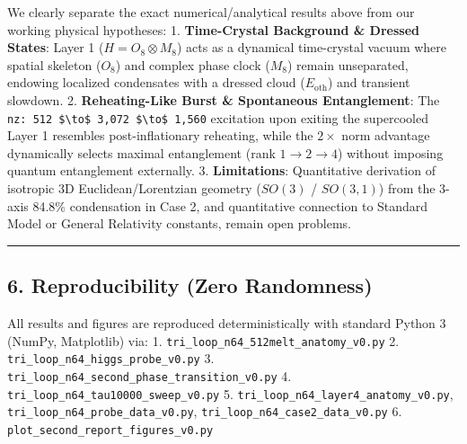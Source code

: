 \documentclass[
  a4paper,
]{article}
\begin{document}
We clearly separate the exact numerical/analytical results above from
our working physical hypotheses: 1. \textbf{Time-Crystal Background \&
Dressed States}: Layer 1 (\(H = O_8 \otimes M_8\)) acts as a dynamical
time-crystal vacuum where spatial skeleton (\(O_8\)) and complex phase
clock (\(M_8\)) remain unseparated, endowing localized condensates with
a dressed cloud (\(E_{\mathrm{oth}}\)) and transient slowdown. 2.
\textbf{Reheating-Like Burst \& Spontaneous Entanglement}: The
\texttt{nz:\ 512\ \$\textbackslash{}to\$\ 3,072\ \$\textbackslash{}to\$\ 1,560}
excitation upon exiting the supercooled Layer 1 resembles
post-inflationary reheating, while the \(2\times\) norm advantage
dynamically selects maximal entanglement (rank \(1 \to 2 \to 4\))
without imposing quantum entanglement externally. 3.
\textbf{Limitations}: Quantitative derivation of isotropic 3D
Euclidean/Lorentzian geometry (\(SO(3)\) / \(SO(3,1)\)) from the 3-axis
84.8\% condensation in Case 2, and quantitative connection to Standard
Model or General Relativity constants, remain open problems.

\begin{center}\rule{0.5\linewidth}{0.5pt}\end{center}

\subsection{6. Reproducibility (Zero
Randomness)}\label{reproducibility-zero-randomness}

All results and figures are reproduced deterministically with standard
Python 3 (NumPy, Matplotlib) via: 1.
\texttt{tri\_\allowbreak{}loop\_\allowbreak{}n64\_\allowbreak{}512melt\_\allowbreak{}anatomy\_\allowbreak{}v0.py} 2.
\texttt{tri\_\allowbreak{}loop\_\allowbreak{}n64\_\allowbreak{}higgs\_\allowbreak{}probe\_\allowbreak{}v0.py} 3.
\texttt{tri\_\allowbreak{}loop\_\allowbreak{}n64\_\allowbreak{}second\_\allowbreak{}phase\_\allowbreak{}transition\_\allowbreak{}v0.py} 4.
\texttt{tri\_\allowbreak{}loop\_\allowbreak{}n64\_\allowbreak{}tau10000\_\allowbreak{}sweep\_\allowbreak{}v0.py} 5.
\texttt{tri\_\allowbreak{}loop\_\allowbreak{}n64\_\allowbreak{}layer4\_\allowbreak{}anatomy\_\allowbreak{}v0.py},
\texttt{tri\_\allowbreak{}loop\_\allowbreak{}n64\_\allowbreak{}probe\_\allowbreak{}data\_\allowbreak{}v0.py},
\texttt{tri\_\allowbreak{}loop\_\allowbreak{}n64\_\allowbreak{}case2\_\allowbreak{}data\_\allowbreak{}v0.py} 6.
\texttt{plot\_\allowbreak{}second\_\allowbreak{}report\_\allowbreak{}figures\_\allowbreak{}v0.py}
\end{document}
